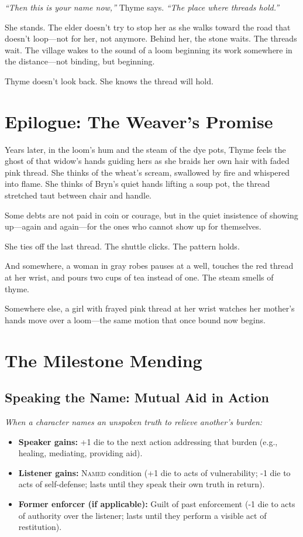 \documentclass[11pt]{book}
\newcommand{\ledger}[1]{\textsc{#1}}
\begin{document}
\textit{``Then this is your name now,'' } Thyme says. \textit{``The place where threads hold.''}

She stands. The elder doesn't try to stop her as she walks toward the road that doesn't loop---not for her, not anymore. Behind her, the stone waits. The threads wait. The village wakes to the sound of a loom beginning its work somewhere in the distance---not binding, but beginning.

Thyme doesn't look back. She knows the thread will hold.

\chapter*{Epilogue: The Weaver's Promise}
Years later, in the loom's hum and the steam of the dye pots, Thyme feels the ghost of that widow's hands guiding hers as she braids her own hair with faded pink thread. She thinks of the wheat's scream, swallowed by fire and whispered into flame. She thinks of Bryn's quiet hands lifting a soup pot, the thread stretched taut between chair and handle.

Some debts are not paid in coin or courage, but in the quiet insistence of showing up---again and again---for the ones who cannot show up for themselves.

She ties off the last thread. The shuttle clicks. The pattern holds.

And somewhere, a woman in gray robes pauses at a well, touches the red thread at her wrist, and pours two cups of tea instead of one. The steam smells of thyme.

Somewhere else, a girl with frayed pink thread at her wrist watches her mother's hands move over a loom---the same motion that once bound now begins.

\appendix
\chapter*{The Milestone Mending}
\section*{Speaking the Name: Mutual Aid in Action}
\textit{When a character names an unspoken truth to relieve another's burden:}
\begin{itemize}
  \item \textbf{Speaker gains:} +1 die to the next action addressing that burden (e.g., healing, mediating, providing aid).
  \item \textbf{Listener gains:} \ledger{Named} condition (+1 die to acts of vulnerability; -1 die to acts of self-defense; lasts until they speak their own truth in return).
  \item \textbf{Former enforcer (if applicable):} Guilt of past enforcement (-1 die to acts of authority over the listener; lasts until they perform a visible act of restitution).
\end{itemize}
\end{document}
